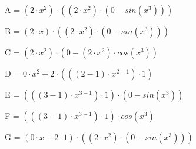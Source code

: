 \documentclass[12pt,a4paper,fleqn]{article}
\begin{document}
\begin{center}
A = $(2 \cdot x^{2}) \cdot ((2 \cdot x^{2}) \cdot (0-sin(x^{3})))$\end{center}
\begin{center}
B = $(2 \cdot x) \cdot ((2 \cdot x^{2}) \cdot (0-sin(x^{3})))$\end{center}
\begin{center}
C = $(2 \cdot x^{2}) \cdot (0-(2 \cdot x^{2}) \cdot cos(x^{3}))$\end{center}
\begin{center}
D = $0 \cdot x^{2}+2 \cdot (((2-1) \cdot x^{2-1}) \cdot 1)$\end{center}
\begin{center}
E = $(((3-1) \cdot x^{3-1}) \cdot 1) \cdot (0-sin(x^{3}))$\end{center}
\begin{center}
F = $(((3-1) \cdot x^{3-1}) \cdot 1) \cdot cos(x^{3})$\end{center}
\begin{center}
G = $(0 \cdot x+2 \cdot 1) \cdot ((2 \cdot x^{2}) \cdot (0-sin(x^{3})))$\end{center}
\end{document}
